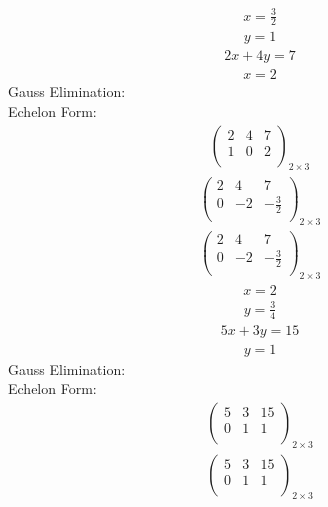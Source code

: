 \documentclass{article}
\begin{document}
\begin{align*}
x=\frac{3}{2}\end{align*}
\begin{align*}
y=1\end{align*}
\begin{align*}
2x + 4y=7\end{align*}
\begin{align*}
x=2\end{align*}
Gauss Elimination:\\
Echelon Form:\\
\begin{align*}
\left(
\begin{array}{cc|c}
2 & 4 & 7\\
1 & 0 & 2\\
\end{array}
\right)_{2\times 3}
\end{align*}
\begin{align*}
\left(
\begin{array}{cc|c}
2 & 4 & 7\\
0 & -2 & -\frac{3}{2}\\
\end{array}
\right)_{2\times 3}
\end{align*}
\begin{align*}
\left(
\begin{array}{cc|c}
2 & 4 & 7\\
0 & -2 & -\frac{3}{2}\\
\end{array}
\right)_{2\times 3}
\end{align*}
\begin{align*}
x=2\end{align*}
\begin{align*}
y=\frac{3}{4}\end{align*}
\begin{align*}
5x + 3y=15\end{align*}
\begin{align*}
y=1\end{align*}
Gauss Elimination:\\
Echelon Form:\\
\begin{align*}
\left(
\begin{array}{cc|c}
5 & 3 & 15\\
0 & 1 & 1\\
\end{array}
\right)_{2\times 3}
\end{align*}
\begin{align*}
\left(
\begin{array}{cc|c}
5 & 3 & 15\\
0 & 1 & 1\\
\end{array}
\right)_{2\times 3}
\end{align*}
\end{document}
